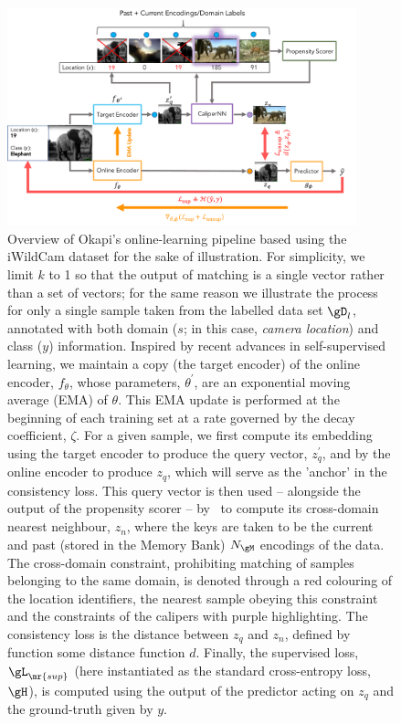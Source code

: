 \begin{figure}[ht]
  \centering
  \includegraphics[width=0.9\textwidth]{figures/ol_pipe_new_new.pdf}
  \caption{
  Overview of Okapi's online-learning pipeline based using the iWildCam dataset for the sake of
  illustration.
  For simplicity, we limit $k$ to 1 so that the output of matching is a single vector rather than a
  set of vectors; for the same reason we illustrate the process for only a single sample taken from
  the labelled data set $\gD_l$, annotated with both domain ($s$; in this case, \emph{camera
  location}) and class ($y$) information.
  Inspired by recent advances in self-supervised learning, we maintain a copy (the target encoder)
  of the online encoder, $f_\theta$, whose parameters, $\theta^\prime$, are an exponential moving
  average (EMA) of $\theta$. 
  This EMA update is performed at the beginning of each training set at a rate governed by the
  decay coefficient, $\zeta$. 
  For a given sample, we first compute its embedding using the target encoder to produce the query
  vector, $z_q^\prime$, and by the online encoder to produce $z_q$, which will serve as the
  'anchor' in the consistency loss. 
  This query vector is then used -- alongside the output of the propensity scorer -- by \CNN\ to
  compute its cross-domain nearest neighbour, $z_n$, where the keys are taken to be the current and
  past (stored in the Memory Bank) $N_\gM$ encodings of the data.
  The cross-domain constraint, prohibiting matching of samples belonging to the same domain, is
  denoted through a red colouring of the location identifiers, the nearest sample obeying this
  constraint and the constraints of the calipers with purple highlighting.
  The consistency loss is the distance between $z_q$ and $z_n$, defined by function some distance
  function $d$. 
  Finally, the supervised loss, $\gL_\mr{sup}$ (here instantiated as the standard cross-entropy
  loss, $\gH$), is computed using the output of the predictor acting on $z_q$ and the ground-truth
  given by $y$.
%
  }
  \label{fig:okapi-pipeline}
\end{figure}
